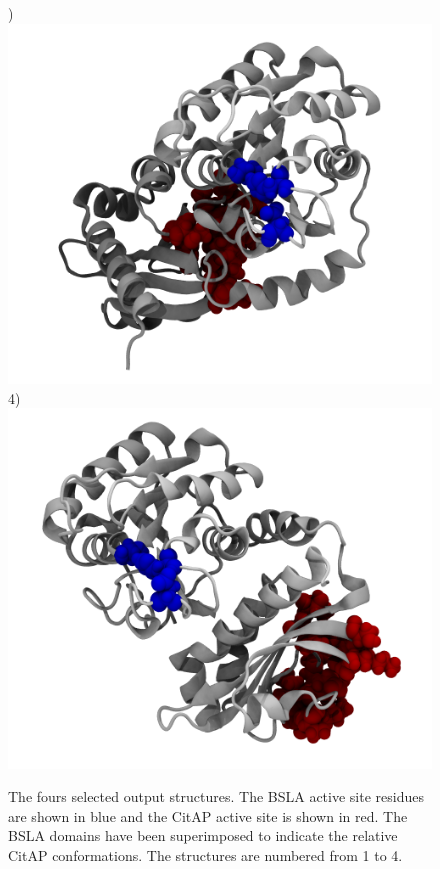 \documentclass[english, a4paper, 12pt, titlepage, draft]{article}
\begin{document}
\begin{figure}
\begin{minipage}[]{0.45\linewidth}
        )
        \includegraphics[width=\textwidth]{figures/Complex_structures/structure2.png}  
        4)
        \includegraphics[width=\textwidth]{figures/Complex_structures/structure4.png}  
    \end{minipage}
    \caption{The fours selected output structures.
        The BSLA active site residues are shown in blue and the CitAP active site is shown in red.
        The BSLA domains have been superimposed to indicate the relative CitAP conformations.
    The structures are numbered from 1 to 4.}
\label{fig:GMIN_output}
\end{figure}       
\end{document}
